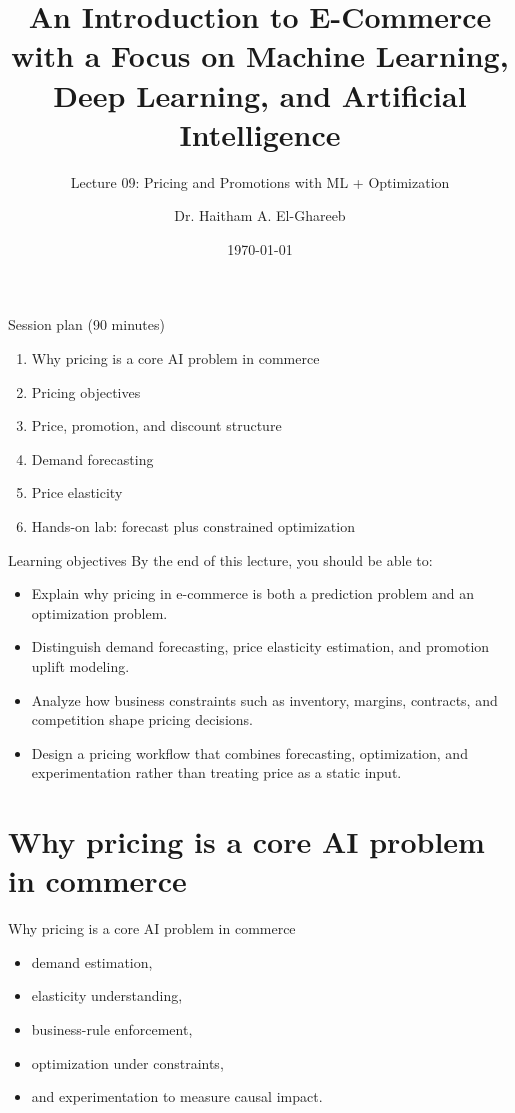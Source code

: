 \documentclass[aspectratio=169]{beamer}
\title[Lecture 09]{An Introduction to E-Commerce\\\small with a Focus on Machine Learning, Deep Learning, and Artificial Intelligence}
\subtitle{Lecture 09: Pricing and Promotions with ML + Optimization}
\author{Dr. Haitham A. El-Ghareeb}
\institute{Faculty of Computers and Information Sciences \\ Mansoura University \\ Egypt}
\date{\today}
\begin{document}
\begin{frame}
  \titlepage
\end{frame}

\begin{frame}{Session plan (90 minutes)}
  \begin{enumerate}
    \item Why pricing is a core AI problem in commerce
    \item Pricing objectives
    \item Price, promotion, and discount structure
    \item Demand forecasting
    \item Price elasticity
    \item Hands-on lab: forecast plus constrained optimization
  \end{enumerate}
\end{frame}

\begin{frame}{Learning objectives}
  By the end of this lecture, you should be able to:
  \begin{itemize}
    \item Explain why pricing in e-commerce is both a prediction problem and an optimization problem.
    \item Distinguish demand forecasting, price elasticity estimation, and promotion uplift modeling.
    \item Analyze how business constraints such as inventory, margins, contracts, and competition shape pricing decisions.
    \item Design a pricing workflow that combines forecasting, optimization, and experimentation rather than treating price as a static input.
  \end{itemize}
\end{frame}

\section{Why pricing is a core AI problem in commerce}

\begin{frame}{Why pricing is a core AI problem in commerce}
  \begin{itemize}
    \item demand estimation,
    \item elasticity understanding,
    \item business-rule enforcement,
    \item optimization under constraints,
    \item and experimentation to measure causal impact.
  \end{itemize}
\end{frame}
\end{document}
